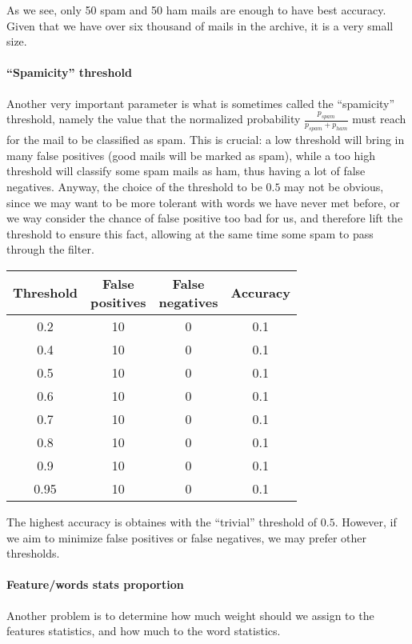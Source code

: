 As we see, only 50 spam and 50 ham mails are enough to have best accuracy. Given that we have over six thousand of mails in the archive, it is a very small size.

\paragraph{``Spamicity'' threshold}
Another very important parameter is what is sometimes called the ``spamicity'' threshold, namely the value that the normalized probability $\frac{p_{spam}}{p_{spam} + p_{ham}}$ must reach for the mail to be classified as spam. This is crucial: a low threshold will bring in many false positives (good mails will be marked as spam), while a too high threshold will classify some spam mails as ham, thus having a lot of false negatives. Anyway, the choice of the threshold to be $0.5$ may not be obvious, since we may want to be more tolerant with words we have never met before, or we way consider the chance of false positive too bad for us, and therefore lift the threshold to ensure this fact, allowing at the same time some spam to pass through the filter.

\begin{center}
\begin{tabular}{cccc}
\toprule
Threshold & \shortstack{False\\ positives} & \shortstack{False\\ negatives} & Accuracy\\
\midrule
0.2  & 10 & 0 & 0.1 \\
0.4  & 10 & 0 & 0.1 \\
0.5  & 10 & 0 & 0.1 \\
0.6  & 10 & 0 & 0.1 \\
0.7  & 10 & 0 & 0.1 \\
0.8  & 10 & 0 & 0.1 \\
0.9  & 10 & 0 & 0.1 \\
0.95 & 10 & 0 & 0.1 \\
\bottomrule
\end{tabular}
\end{center}

The highest accuracy is obtaines with the ``trivial'' threshold of $0.5$. However, if we aim to minimize false positives or false negatives, we may prefer other thresholds.

\paragraph{Feature/words stats proportion}
Another problem is to determine how much weight should we assign to the features statistics, and how much to the word statistics.

